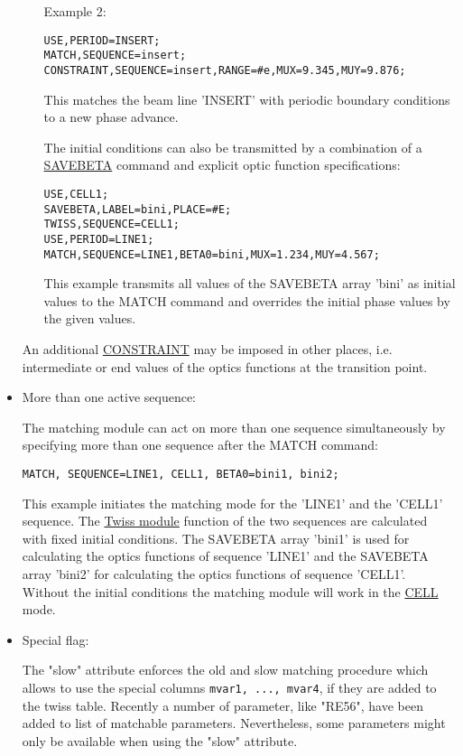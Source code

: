 \begin{itemize}
\begin{itemize}
Example 2:	
\begin{verbatim}
USE,PERIOD=INSERT;
MATCH,SEQUENCE=insert;
CONSTRAINT,SEQUENCE=insert,RANGE=#e,MUX=9.345,MUY=9.876;
\end{verbatim}
This matches the beam line 'INSERT' with periodic boundary conditions to
a new phase advance. 


 
The initial conditions can also be transmitted by a combination of a
\href{../control/general.html#savebeta}{SAVEBETA} command and explicit
optic function specifications: 
\begin{verbatim}
USE,CELL1;
SAVEBETA,LABEL=bini,PLACE=#E;
TWISS,SEQUENCE=CELL1;
USE,PERIOD=LINE1;
MATCH,SEQUENCE=LINE1,BETA0=bini,MUX=1.234,MUY=4.567;
\end{verbatim}

This example transmits all values of the SAVEBETA array 'bini' as
initial values to the MATCH command and overrides the initial phase
values by the given values.

\end{itemize}

An additional \href{match_con.html#constraint}{CONSTRAINT} may be
imposed in other places, i.e. intermediate or end values of the optics
functions at the transition point.  
 
\item More than one active sequence:

The matching module can act on more than one sequence simultaneously by
specifying more than one sequence after the MATCH command: 
\begin{verbatim}
MATCH, SEQUENCE=LINE1, CELL1, BETA0=bini1, bini2;
\end{verbatim}
This example initiates the matching mode for the 'LINE1' and the 'CELL1'
sequence. The \href{../twiss/twiss.html}{Twiss module} function of the
two sequences are calculated with fixed initial conditions. The SAVEBETA
array 'bini1' is used for calculating the optics functions of sequence
'LINE1' and the SAVEBETA array 'bini2' for calculating the optics
functions of sequence 'CELL1'. Without the initial conditions the
matching module will work in the \href{match_main.html#cell}{CELL}
mode. 
 
	\item  Special flag:

The "slow" attribute enforces the old and slow matching procedure which
allows to use the special columns \texttt{mvar1, ..., mvar4}, if they
are added to the twiss table. Recently a number of parameter, like
"RE56", have been added to list of matchable parameters. Nevertheless,
some parameters might only be available when using the "slow" attribute. 
 
\end{itemize}
 
